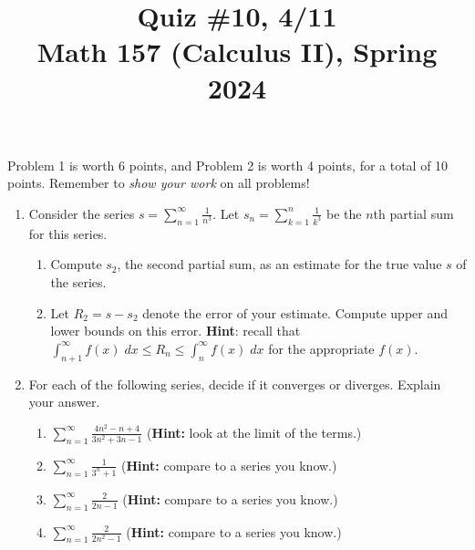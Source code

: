 \documentclass[11pt]{article}
\title{Quiz \#10, 4/11\\ Math 157 (Calculus II), Spring 2024}
\date{}
\begin{document}
\maketitle

\thispagestyle{empty}

\vspace{-2cm}

Problem 1 is worth 6 points, and Problem 2 is worth 4 points, for a total of 10 points. Remember to \emph{show your work} on all problems!

\begin{enumerate}

\item Consider the series $s = \displaystyle \sum_{n=1}^{\infty}\frac{1}{n^3}$. Let $s_n = \displaystyle \sum_{k=1}^{n} \frac{1}{k^3}$ be the $n$th partial sum for this series.

\begin{enumerate}
\item Compute $s_2$, the second partial sum, as an estimate for the true value $s$ of the series.
\item Let $R_2 = s - s_2$ denote the error of your estimate. Compute upper and lower bounds on this error. {\bf Hint}: recall that $\int_{n+1}^{\infty} f(x) \; dx \leq R_n \leq \int_{n}^{\infty} f(x) \; dx$ for the appropriate $f(x)$.
\end{enumerate}

\vspace{2.15in}

\item For each of the following series, decide if it converges or diverges. Explain your answer.

\begin{enumerate}
\item $\displaystyle \sum_{n=1}^{\infty} \frac{4n^2-n+4}{3n^2+3n-1}$ \hfill ({\bf Hint:} look at the limit of the terms.)
\item $\displaystyle \sum_{n=1}^{\infty} \frac{1}{3^n + 1}$ \hfill ({\bf Hint:} compare to a series you know.)
\item $\displaystyle \sum_{n=1}^{\infty} \frac{2}{2n-1}$ \hfill ({\bf Hint:} compare to a series you know.)
\item $\displaystyle \sum_{n=1}^{\infty} \frac{2}{2n^2-1}$ \hfill ({\bf Hint:} compare to a series you know.)
\end{enumerate}

\end{enumerate}
\end{document}
